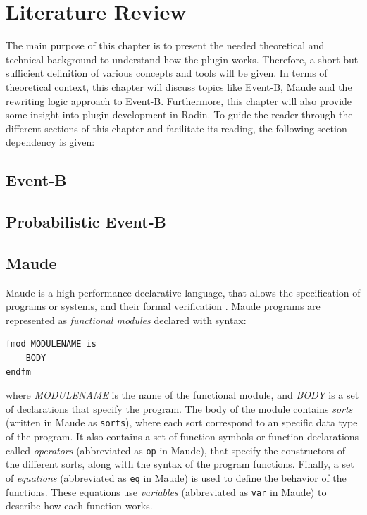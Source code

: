 \chapter{Literature Review}
The main purpose of this chapter is to present the needed theoretical and technical background to understand how the plugin works. Therefore, a short but sufficient definition of various concepts and tools will be given. In terms of theoretical context, this chapter will discuss topics like  Event-B, Maude and the rewriting logic approach to Event-B. Furthermore, this chapter will also provide some insight into plugin development in Rodin. To guide the reader through the different sections of this chapter and facilitate its reading, the following section dependency is given:



\section{Event-B}

\section{Probabilistic Event-B}

\section{Maude}

Maude is a high performance declarative language, that allows the specification of programs or systems, and their formal verification \cite{MaudeManual, Lecture1, PeterMaude}.
Maude programs are represented as \textit{functional modules} declared with syntax:
\begin{lstlisting}
fmod MODULENAME is
    BODY
endfm
\end{lstlisting}
where \textit{MODULENAME} is the name of the functional module, and \textit{BODY} is a set of declarations that specify the program. The body of the module contains \textit{sorts} (written in Maude as \texttt{sorts}), where each sort correspond to an specific data type of the program. It also contains a set of function symbols or function declarations called \textit{operators} (abbreviated as \texttt{op} in Maude), that specify the constructors of the different sorts, along with the syntax of the program functions. Finally, a set of \textit{equations} (abbreviated as \texttt{eq} in Maude) is used to define the behavior of the functions. These equations use \textit{variables} (abbreviated as \texttt{var} in Maude) to describe how each function works. 

